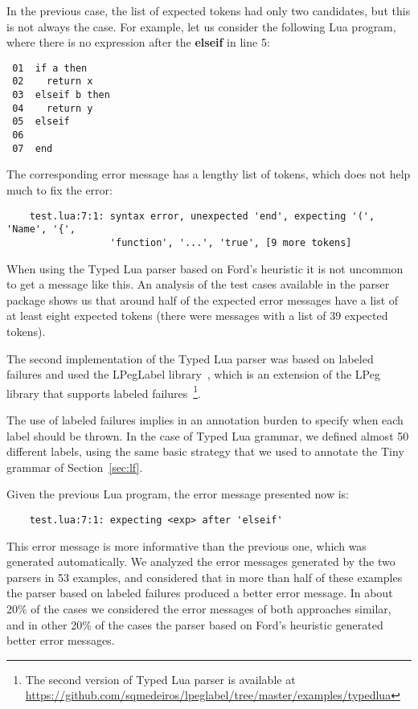 \documentclass[3p,12pt,singlecolumn]{elsarticle}
\begin{document}
In the previous case, the list of expected tokens had only two
candidates, but this is not always the case. For example, let us
consider the following Lua program, where there is no expression
after the \textbf{elseif} in line 5:
\begin{verbatim}
 01  if a then
 02    return x
 03  elseif b then
 04    return y
 05  elseif
 06
 07  end
\end{verbatim}

The corresponding error message has a lengthy list of tokens,
which does not help much to fix the error:
\begin{verbatim}
    test.lua:7:1: syntax error, unexpected 'end', expecting '(', 'Name', '{', 
                  'function', '...', 'true', [9 more tokens] 
\end{verbatim}

When using the Typed Lua parser based on Ford's heuristic it is not
uncommon to get a message like this. An analysis of the test cases
available in the parser package shows us that around half of the
expected error messages have a list of at least eight expected tokens
(there were messages with a list of 39 expected tokens).

The second implementation of the Typed Lua parser was 
based on labeled failures and used the LPegLabel library~\cite{lpeglabel},
which is an extension of the LPeg library that supports
labeled failures~\footnote{The second version of Typed Lua parser is available at
\url{https://github.com/sqmedeiros/lpeglabel/tree/master/examples/typedlua}}.

The use of labeled failures implies in an annotation burden to
specify when each label should be thrown. In the case of Typed Lua grammar,
we defined almost 50 different labels, using the same basic strategy
that we used to annotate the Tiny grammar of Section~\ref{sec:lf}.

Given the previous Lua program, the error message presented now is:
\begin{verbatim}
    test.lua:7:1: expecting <exp> after 'elseif'
\end{verbatim}

This error message is more informative than the previous one,
which was generated automatically. We analyzed the error
messages generated by the two parsers in 53 examples,
and considered that in more than half of these examples
the parser based on labeled failures produced a better
error message. In about 20\% of the cases we considered
the error messages of both approaches similar, and in other
20\% of the cases the parser based on Ford's heuristic
generated better error messages.
\end{document}
